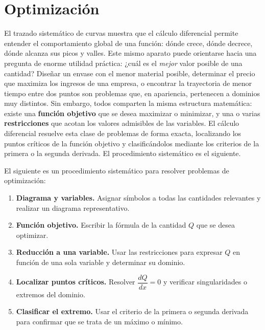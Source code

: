 \section{Optimización}

El trazado sistemático de curvas muestra que el cálculo diferencial
permite entender el comportamiento global de una función: dónde crece,
dónde decrece, dónde alcanza sus picos y valles. Este mismo aparato
puede orientarse hacia una pregunta de enorme utilidad práctica:
¿cuál es el \emph{mejor} valor posible de una cantidad? Diseñar un
envase con el menor material posible, determinar el precio que maximiza
los ingresos de una empresa, o encontrar la trayectoria de menor tiempo
entre dos puntos son problemas que, en apariencia, pertenecen a dominios
muy distintos. Sin embargo, todos comparten la misma estructura
matemática: existe una \textbf{función objetivo} que se desea maximizar
o minimizar, y una o varias \textbf{restricciones} que acotan los
valores admisibles de las variables. El cálculo diferencial resuelve
esta clase de problemas de forma exacta, localizando los puntos críticos
de la función objetivo y clasificándolos mediante los criterios de la
primera o la segunda derivada. El procedimiento sistemático es el
siguiente.

\begin{pasos}
El siguiente es un procedimiento sistemático para resolver problemas
de optimización:
\begin{enumerate}
    \item \textbf{Diagrama y variables.} Asignar símbolos a todas las
    cantidades relevantes y realizar un diagrama representativo.
    \item \textbf{Función objetivo.} Escribir la fórmula de la cantidad
    $Q$ que se desea optimizar.
    \item \textbf{Reducción a una variable.} Usar las restricciones para
    expresar $Q$ en función de una sola variable y determinar su dominio.
    \item \textbf{Localizar puntos críticos.} Resolver $\dfrac{dQ}{dx}=0$
    y verificar singularidades o extremos del dominio.
    \item \textbf{Clasificar el extremo.} Usar el criterio de la primera
    o segunda derivada para confirmar que se trata de un máximo o mínimo.
\end{enumerate}
\end{pasos}



